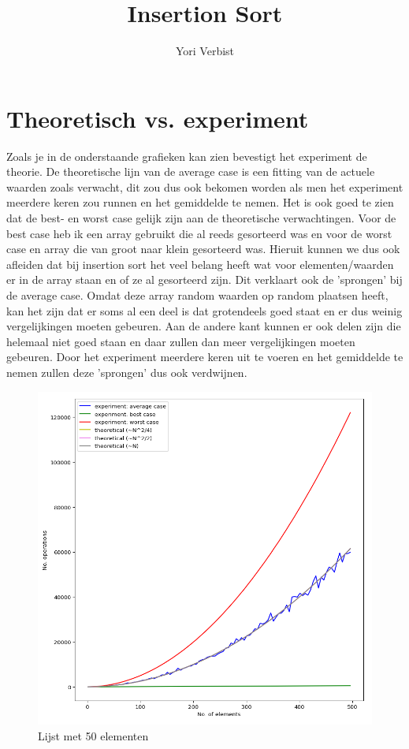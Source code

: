 \documentclass[]{article}
\title{\vspace{-3.0cm}Insertion Sort}
\author{Yori Verbist}
\begin{document}
	
	\maketitle
	
	\section{Theoretisch vs. experiment}
	Zoals je in de onderstaande grafieken kan zien bevestigt het experiment de theorie. De theoretische lijn van de average case is een fitting van de actuele waarden zoals verwacht, dit zou dus ook bekomen worden als men het experiment meerdere keren zou runnen en het gemiddelde te nemen. \newline
	Het is ook goed te zien dat de best- en worst case gelijk zijn aan de theoretische verwachtingen. Voor de best case heb ik een array gebruikt die al reeds gesorteerd was en voor de worst case en array die van groot naar klein gesorteerd was.\newline
	Hieruit kunnen we dus ook afleiden dat bij insertion sort het veel belang heeft wat voor elementen/waarden er in de array staan en of ze al gesorteerd zijn. \newline
	 Dit verklaart ook de 'sprongen' bij de average case. Omdat deze array random waarden op random plaatsen heeft, kan het zijn dat er soms al een deel is dat grotendeels goed staat en er dus weinig vergelijkingen moeten gebeuren. Aan de andere kant kunnen er ook delen zijn die helemaal niet goed staan en daar zullen dan meer vergelijkingen moeten gebeuren. Door het experiment meerdere keren uit te voeren en het gemiddelde te nemen zullen deze 'sprongen' dus ook verdwijnen.
	
	\begin{figure}[h!]
		\centering

			\includegraphics[width=.5\textwidth]{small}
			\caption{Lijst met 50 elementen}
	\end{figure}
	
	
\end{document}
